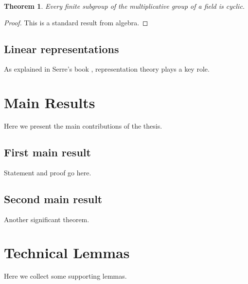 \documentclass[12pt,reqno]{amsbook}
\newtheorem{theorem}{Theorem}[chapter]
\theoremstyle{definition}
\begin{document}
\begin{theorem}
Every finite subgroup of the multiplicative group of a field is cyclic.
\end{theorem}

\begin{proof}
This is a standard result from algebra.
\end{proof}

\section{Linear representations}
As explained in Serre's book \cite{serre}, representation theory plays a key role.

\chapter{Main Results}
Here we present the main contributions of the thesis.

\section{First main result}
Statement and proof go here.

\section{Second main result}
Another significant theorem.

\appendix
\chapter{Technical Lemmas}
Here we collect some supporting lemmas.

\end{document}
